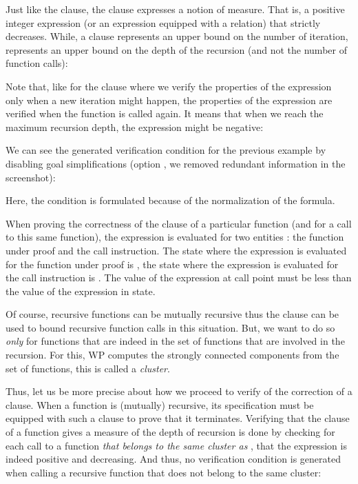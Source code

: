 Just like the  clause, the 
clause expresses a notion of measure. That is, a positive integer expression
(or an expression equipped with a relation) that strictly decreases. While, a
 clause represents an upper bound on the number of
iteration,  represents an upper bound on the depth of the
recursion (and not the number of function calls):




Note that, like for the  clause where we verify the
properties of the expression only when a new iteration might happen, the
properties of the  expression are verified when the
function is called again. It means that when we reach the maximum recursion
depth, the expression might be negative:




We can see the generated verification condition for the previous example by
disabling goal simplifications (option , we removed
redundant information in the screenshot):



Here, the condition  is formulated
 because of the normalization of the
formula.


When proving the correctness of the  clause of a particular
function (and for a call to this same function), the expression is evaluated
for two entities : the function under proof and the call instruction. The state
where the expression is evaluated for the function under proof is
, the state where the expression is evaluated for the call
instruction is . The value of the expression at call point must
be less than the value of the expression in  state.




Of course, recursive functions can be mutually recursive thus the
 clause can be used to bound recursive function calls in
this situation. But, we want to do so {\em only} for functions that are
indeed in the set of functions that are involved in the recursion. For this, WP
computes the strongly connected components from the set of functions, this is
called a {\em cluster}.

Thus, let us be more precise about how we proceed to verify of the
correction of a  clause. When a function is (mutually)
recursive, its specification must be equipped with such a clause to prove that
it terminates. Verifying that the  clause of a function
 gives a measure of the depth of recursion is done by checking for
each call to a function \emph{that belongs to the same cluster as
}, that the expression is indeed positive and decreasing. And
thus, no verification condition is generated when calling a recursive function
that does not belong to the same cluster:


